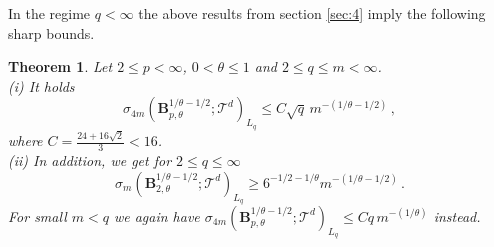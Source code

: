 \documentclass[11pt,reqno]{article}
\numberwithin{equation}{section}
\theoremstyle{definition}
\theoremstyle{plain}
\newtheorem{satz}{Theorem}[section]
\newcommand{\be}{\begin{equation}}
\newcommand{\ee}{\end{equation}}
\begin{document}
In the regime \(q<\infty\) the above results from section \ref{sec:4} imply the following sharp bounds. 
 \begin{satz}\label{thm:5.3} 
Let  $2\leq p<\infty$, $0<\theta \leq 1$ and $2\leq q \leq m <\infty$.\\ 
{\em (i)} It holds
\be\label{thm:4.4:Besov}
\sigma_{4m}(\mathbf{B}^{1/\theta-1/2}_{p,\theta};\mathcal{T}^d)_{L_q} \leq C \sqrt{q}\, m^{-(1/\theta-1/2)}\,,
\ee
where  $C =\frac{24 + 16 \sqrt{2}}{3} <  16$.\\
{\em (ii)} In addition, we get for $2\leq q \leq \infty$ 
\be\label{eq:5.8:Besov_below}
\sigma_{m}(\mathbf{B}^{1/\theta-1/2}_{2,\theta};\mathcal{T}^d)_{L_q} \geq 6^{-1/2-1/\theta} m^{-(1/\theta-1/2)} \,.
\ee
For small \(m < q\) we again have \(\sigma_{4m}(\mathbf{B}^{1/\theta-1/2}_{p,\theta};\mathcal{T}^d)_{L_q} \leq C q\, m^{-(1/\theta)}\) instead.
 \end{satz}
\end{document}
